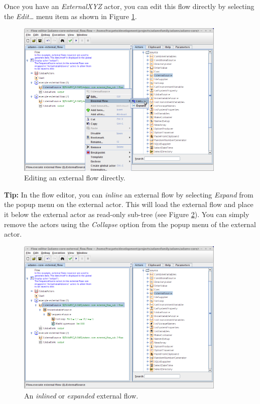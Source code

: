 Once you have an \textit{ExternalXYZ} actor, you can edit this flow directly by 
selecting the \textit{Edit\ldots} menu item as shown in Figure 
\ref{floweditor-externalactors1_editsubflow}.
\begin{figure}[htb]
  \centering
  \includegraphics[width=10.0cm]{images/floweditor-externalactors1_editsubflow.png}
  \caption{Editing an external flow directly.}
  \label{floweditor-externalactors1_editsubflow}
\end{figure}

\textbf{Tip:} In the flow editor, you can \textit{inline} an external flow by
selecting \textit{Expand} from the popup menu on the external
actor. This will load the external flow and place it below the external actor
as read-only sub-tree (see Figure \ref{floweditor-externalactors1_expandedsubflow}). You can simply remove the actors using the
\textit{Collapse} option from the popup menu of the external actor.

\begin{figure}[htb]
  \centering
  \includegraphics[width=10.0cm]{images/floweditor-externalactors1_expandedsubflow.png}
  \caption{An \textit{inlined} or \textit{expanded} external flow.}
  \label{floweditor-externalactors1_expandedsubflow}
\end{figure}


